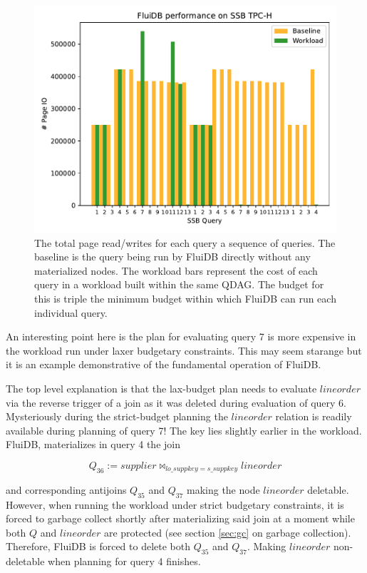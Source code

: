 \begin{figure}[p]
\centering
\includegraphics[width=.9\linewidth]{./plans/io_perf_61000.pdf}

\caption{\label{fig:large_budget_plot}
  The total page read/writes for each query a sequence of queries. The
  baseline is the query being run by FluiDB directly without any
  materialized nodes. The workload bars represent the cost of each
  query in a workload built within the same QDAG. The budget for this
  is triple the minimum budget within which FluiDB can run each
  individual query.}
\end{figure}

An interesting point here is the plan for evaluating query 7 is more
expensive in the workload run under laxer budgetary constraints. This
may seem starange but it is an example demonstrative of the
fundamental operation of FluiDB.

The top level explanation is that the lax-budget plan needs to
evaluate \(\mathit{lineorder}\) via the reverse trigger of a join as
it was deleted during evaluation of query 6. Mysteriously during the
strict-budget planning the \(\mathit{lineorder}\) relation is readily
available during planning of query 7! The key lies slightly earlier in
the workload. FluiDB, materializes in query 4 the join

\[
Q_{36} := \mathit{supplier} \Join_{\mathit{lo\_suppkey} = \mathit{s\_suppkey}} \mathit{lineorder}
\]

and corresponding antijoins \(Q_{35}\) and \(Q_{37}\) making the node
\(\mathit{lineorder}\) deletable. However, when running the workload
under strict budgetary constraints, it is forced to garbage collect
shortly after materializing said join at a moment while both \(Q\) and
\(\mathit{lineorder}\) are protected (see section \ref{sec:gc} on
garbage collection). Therefore, FluiDB is forced to delete both
\(Q_{35}\) and \(Q_{37}\). Making \(\mathit{lineorder}\) non-deletable
when planning for query 4 finishes.

